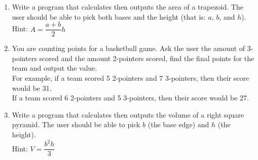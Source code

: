 \documentclass{article}
\begin{document}
\begin{enumerate}
	\item 
		Write a program that calculates then outputs the area of a trapezoid.  
		The user should be able to pick both bases and the height (that is: $a$, $b$, and $h$).\\
		Hint: $A = \dfrac{a+b}{2}h$
		
		\vspace*{-3em}
		\begin{flushright}
		\end{flushright}



	\item 
		You are counting points for a basketball game. Ask the user the amount of 3-pointers scored 
		and the amount 2-pointers scored, find the final points for the team and output the value.\\
		For example, if a team scored 5 2-pointers and 7 3-pointers, then their score would be 31.\\
		If a team scored 6 2-pointers and 5 3-pointers, then their score would be 27.
	
	
	\item 
		Write a program that calculates then outputs the volume of a right square pyramid.  
		The user should be able to pick $b$ (the base edge) and $h$ (the height).\\
		Hint: $V = \dfrac{b^2 h}{3}$
		

\end{enumerate}
\end{document}
